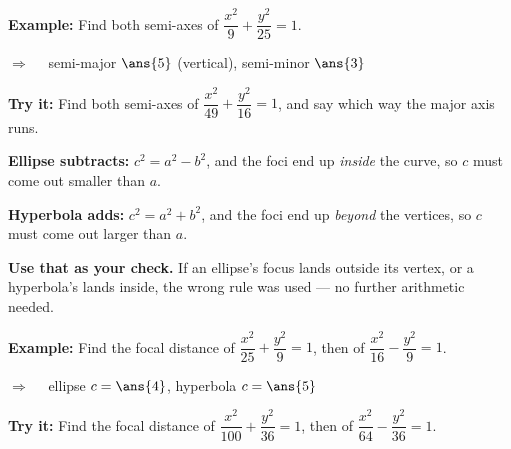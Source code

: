 \documentclass[12pt]{article}
\begin{document}
\begin{examplebox}
\textbf{Example:} \quad Find both semi-axes of $\dfrac{x^2}{9} + \dfrac{y^2}{25} = 1$.

$\Rightarrow\quad$ semi-major $\ans{5}$ (vertical), \quad semi-minor $\ans{3}$
\end{examplebox}

\begin{tryitbox}
\textbf{Try it:} \quad Find both semi-axes of $\dfrac{x^2}{49} + \dfrac{y^2}{16} = 1$, and say which way the major axis runs.\\[2pt]
\end{tryitbox}


\begin{formulabox}
\textbf{Ellipse subtracts:} $c^2 = a^2 - b^2$, and the foci end up \emph{inside} the curve, so
$c$ must come out smaller than $a$.\par
\textbf{Hyperbola adds:} $c^2 = a^2 + b^2$, and the foci end up \emph{beyond} the vertices, so
$c$ must come out larger than $a$.\par
\textbf{Use that as your check.} If an ellipse's focus lands outside its vertex, or a
hyperbola's lands inside, the wrong rule was used --- no further arithmetic needed.
\end{formulabox}

\begin{examplebox}
\textbf{Example:} \quad Find the focal distance of $\dfrac{x^2}{25} + \dfrac{y^2}{9} = 1$, then of $\dfrac{x^2}{16} - \dfrac{y^2}{9} = 1$.

$\Rightarrow\quad$ ellipse $c = \ans{4}$, \quad hyperbola $c = \ans{5}$
\end{examplebox}

\begin{tryitbox}
\textbf{Try it:} \quad Find the focal distance of $\dfrac{x^2}{100} + \dfrac{y^2}{36} = 1$, then of $\dfrac{x^2}{64} - \dfrac{y^2}{36} = 1$.\\[2pt]
\end{tryitbox}
\end{document}
